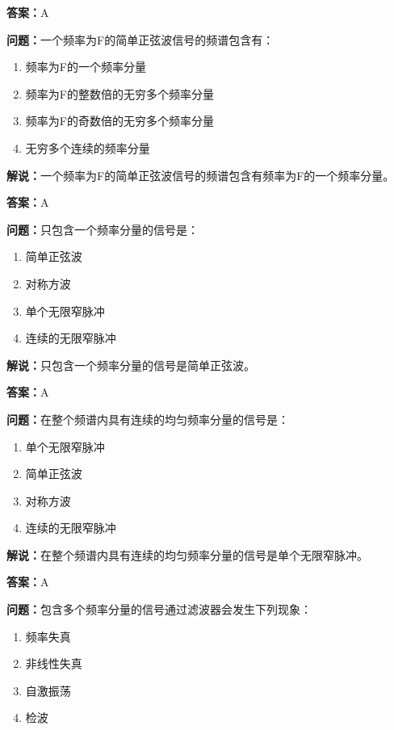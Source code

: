 \textbf{答案：}A

\textbf{问题：}一个频率为F的简单正弦波信号的频谱包含有：

\begin{enumerate}[label=\Alph*), leftmargin=1cm]
	\item 频率为F的一个频率分量
	\item 频率为F的整数倍的无穷多个频率分量
	\item 频率为F的奇数倍的无穷多个频率分量
	\item 无穷多个连续的频率分量
\end{enumerate}

\textbf{解说：}一个频率为F的简单正弦波信号的频谱包含有频率为F的一个频率分量。%

\textbf{答案：}A

\textbf{问题：}只包含一个频率分量的信号是：
\begin{enumerate}[label=\Alph*), leftmargin=1cm]
	\item 简单正弦波
	\item 对称方波
	\item 单个无限窄脉冲
	\item 连续的无限窄脉冲
\end{enumerate}

\textbf{解说：}只包含一个频率分量的信号是简单正弦波。%

\textbf{答案：}A

\textbf{问题：}在整个频谱内具有连续的均匀频率分量的信号是：

\begin{enumerate}[label=\Alph*), leftmargin=1cm]
	\item 单个无限窄脉冲
	\item 简单正弦波
	\item 对称方波
	\item 连续的无限窄脉冲
\end{enumerate}

\textbf{解说：}在整个频谱内具有连续的均匀频率分量的信号是单个无限窄脉冲。%

\textbf{答案：}A

\textbf{问题：}包含多个频率分量的信号通过滤波器会发生下列现象：

\begin{enumerate}[label=\Alph*), leftmargin=1cm]
	\item 频率失真
	\item 非线性失真
	\item 自激振荡
	\item 检波
\end{enumerate}


